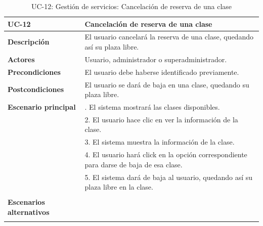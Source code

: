 \begin{table}[H]
  \begin{center}
    \begin{tabularx}{16.4cm}{|l|X|}
      \hline
      \textbf{UC-12} & \textbf{Cancelación de reserva de una clase}\\
      \hline
      \textbf{Descripción} & El usuario cancelará la reserva de una clase, quedando así su plaza libre.\\
      \hline
      \textbf{Actores} & Usuario, administrador o superadministrador.\\
      \hline
      \textbf{Precondiciones} & El usuario debe haberse identificado previamente.\\
      \hline
      \textbf{Postcondiciones} & El usuario se dará de baja en una clase, quedando su plaza libre.\\
      \hline
      \textbf{Escenario principal} & \smallskip 1. El sistema mostrará las clases disponibles.\\
      & 2. El usuario hace clic en ver la información de la clase.\\
      & 3. El sistema muestra la información de la clase.\\
      & 4. El usuario hará click en la opción correspondiente para darse de baja de esa clase.\\
      & 5. El sistema dará de baja al usuario, quedando así su plaza libre en la clase. \\
      & \\
      \hline
      \textbf{Escenarios alternativos} & \\ 
      & \\
      \hline
    \end{tabularx}
    \caption{UC-12: Gestión de servicios: Cancelación de reserva de una clase}
    \label{tab:CU-cancelar-reserva-clase}
  \end{center}
\end{table}


